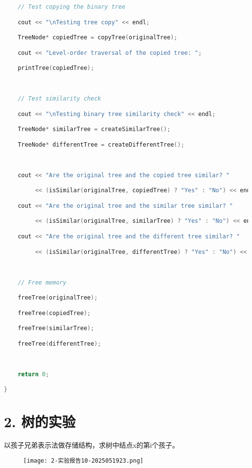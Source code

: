 \begin{lstlisting}[language=C++]
    // Test copying the binary tree

    cout << "\nTesting tree copy" << endl;

    TreeNode* copiedTree = copyTree(originalTree);

    cout << "Level-order traversal of the copied tree: ";

    printTree(copiedTree);

  

    // Test similarity check

    cout << "\nTesting binary tree similarity check" << endl;

    TreeNode* similarTree = createSimilarTree();

    TreeNode* differentTree = createDifferentTree();

  

    cout << "Are the original tree and the copied tree similar? "

         << (isSimilar(originalTree, copiedTree) ? "Yes" : "No") << endl;

    cout << "Are the original tree and the similar tree similar? "

         << (isSimilar(originalTree, similarTree) ? "Yes" : "No") << endl;

    cout << "Are the original tree and the different tree similar? "

         << (isSimilar(originalTree, differentTree) ? "Yes" : "No") << endl;

  

    // Free memory

    freeTree(originalTree);

    freeTree(copiedTree);

    freeTree(similarTree);

    freeTree(differentTree);

  

    return 0;

}

\end{lstlisting}
\section{2. 树的实验}

以孩子兄弟表示法做存储结构，求树中结点x的第i个孩子。

\begin{figure}[H]
\centering
\texttt{[image: 2-实验报告10-2025051923.png]}
\label{}
\end{figure}

